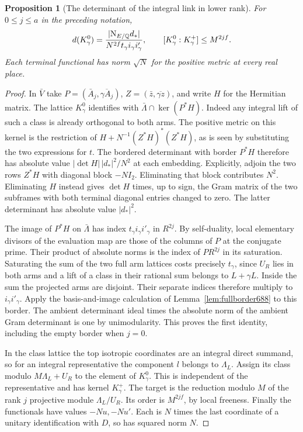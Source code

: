 \documentclass[a4paper,11pt]{article}
\newtheorem{proposition}{Proposition}[section]
\theoremstyle{definition}
\theoremstyle{remark}
\numberwithin{equation}{section}
\begin{document}
\begin{proposition}[The determinant of the integral link in lower rank]
\leavevmode\label{prop:closedborder689}
For \(0\le j\le a\) in the preceding notation,
\[
 d(K_\gamma^0)=
   \frac{|{\rm N}_{E/\mathbb Q}d_*|}
        {N^{2f}t_\gamma i_\gamma i'_\gamma},\qquad
 [K_\gamma^0:K_\gamma^+]\le M^{2jf}.
\]
Each terminal functional has norm \(\sqrt N\) for the positive
metric at every real place.
\end{proposition}
\begin{proof}
In \(\bar V\) take \(P=(\bar A_j,\overline{\gamma A_j})\),
\(Z=(\bar z,\overline{\gamma z})\), and write \(H\) for the
Hermitian matrix. The lattice \(K_\gamma^0\) identifies with
\(\bar\Lambda\cap\ker(P^*H)\). Indeed any integral lift of
such a class is already orthogonal to both arms. The positive
metric on this kernel is the restriction of
\(H+N^{-1}(Z^*H)^*(Z^*H)\), as is seen by substituting the
two expressions for \(t\). The bordered determinant with
border \(P^*H\) therefore has absolute value
\(|\det H|\,|d_*|^2/N^2\) at each embedding. Explicitly,
adjoin the two rows \(Z^*H\) with diagonal block \(-NI_2\).
Eliminating that block contributes \(N^2\). Eliminating \(H\)
instead gives \(\det H\) times, up to sign, the Gram matrix
of the two subframes with both terminal diagonal entries
changed to zero. The latter determinant has absolute value
\(|d_*|^2\).

The image of \(P^*H\) on \(\bar\Lambda\) has index
\(t_\gamma i_\gamma i'_\gamma\) in \(R^{2j}\).
By self-duality, local elementary divisors of the evaluation
map are those of the columns of \(P\) at the conjugate prime.
Their product of absolute norms is the index of \(PR^{2j}\)
in its saturation. Saturating the sum of the two full arm
lattices costs precisely \(t_\gamma\), since \(U_R\) lies in
both arms and a lift of a class in their rational sum belongs
to \(L+\gamma L\). Inside the sum the projected arms are
disjoint. Their separate indices therefore multiply to
\(i_\gamma i'_\gamma\). Apply the basis-and-image calculation
of Lemma~\ref{lem:fullborder688} to this border. The ambient
determinant ideal times the absolute norm of the ambient
Gram determinant is one by unimodularity. This proves the
first identity, including the empty border when \(j=0\).

In the class lattice the top isotropic coordinates are an
integral direct summand, so for an integral representative
the component \(l\) belongs to \(\Lambda_L\). Assign its
class modulo \(M\Lambda_L+U_R\) to the element of \(K_\gamma^0\).
This is independent of the representative and has kernel
\(K_\gamma^+\). The target is the reduction modulo \(M\)
of the rank \(j\) projective module \(\Lambda_L/U_R\).
Its order is \(M^{2jf}\), by local freeness. Finally the
functionals have values \(-Nu,-Nu'\). Each is \(N\) times the
last coordinate of a unitary identification with \(D\), so
has squared norm \(N\).
\end{proof}
\end{document}
